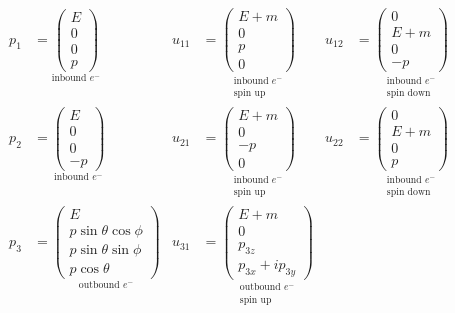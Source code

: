\documentclass[12pt]{article}
\begin{document}
\begin{align*}
p_1&=\underset{\text{inbound $e^-$}}
{\begin{pmatrix}E\\0\\0\\p\end{pmatrix}}
& u_{11}&=\underset{\substack{\text{inbound $e^-$}\\\text{spin up}}}
{\begin{pmatrix}E+m\\0\\p\\0\end{pmatrix}}
& u_{12}&=\underset{\substack{\text{inbound $e^-$}\\\text{spin down}}}
{\begin{pmatrix}0\\E+m\\0\\-p\end{pmatrix}}
\\[1ex]
p_2&=
\underset{\text{inbound $e^-$}}
{\begin{pmatrix}E\\0\\0\\-p\end{pmatrix}}
& u_{21}&=\underset{\substack{\text{inbound $e^-$}\\\text{spin up}}}
{\begin{pmatrix}E+m\\0\\-p\\0\end{pmatrix}}
& u_{22}&=\underset{\substack{\text{inbound $e^-$}\\\text{spin down}}}
{\begin{pmatrix}0\\E+m\\0\\p\end{pmatrix}}
\\[1ex]
p_3&=
\underset{\text{outbound $e^-$}}
{\begin{pmatrix}
E\\
p\sin\theta\cos\phi\\
p\sin\theta\sin\phi\\
p\cos\theta
\end{pmatrix}}
& u_{31}&=\underset{\substack{\text{outbound $e^-$}\\\text{spin up}}}
{\begin{pmatrix}E+m\\0\\p_{3z}\\p_{3x}+ip_{3y}\end{pmatrix}}

\end{align*}
\end{document}
